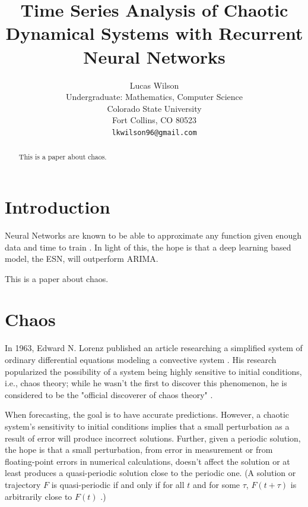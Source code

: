 \documentclass{article}
\title{Time Series Analysis of Chaotic Dynamical Systems with Recurrent Neural Networks}
\author{
  Lucas Wilson \\
  Undergraduate: Mathematics, Computer Science \\
  Colorado State University\\
  Fort Collins, CO 80523 \\
  \texttt{lkwilson96@gmail.com} \\
}
\begin{document}
\maketitle

\begin{abstract}
This is a paper about chaos.
\end{abstract}

\section{Introduction}

Neural Networks are known to be able to approximate any function given enough
data and time to train \cite{cybenko1989approximation}. In light of this, the
hope is that a deep learning based model, the ESN, will outperform ARIMA.

This is a paper about chaos.

\section{Chaos}


In 1963, Edward N. Lorenz published an article researching a simplified
system of ordinary differential equations modeling a convective system
\cite{lorenz1963deterministic}. His research popularized the possibility of a
system being highly sensitive to initial conditions, i.e., chaos theory;
while he wasn't the first to discover this phenomenon, he is considered to be
the "official discoverer of chaos theory" \cite{oestreicher2007history}.

When forecasting, the goal is to have accurate predictions. However, a
chaotic system's sensitivity to initial conditions implies that a small
perturbation as a result of error will produce incorrect solutions. Further,
given a periodic solution, the hope is that a small perturbation, from error
in measurement or from floating-point errors in numerical calculations,
doesn't affect the solution or at least produces a quasi-periodic solution
close to the periodic one. (A solution or trajectory $F$ is quasi-periodic if
and only if for all $t$ and for some $\tau$, $F(t+\tau)$ is arbitrarily close
to $F(t)$ \cite{lorenz1963deterministic}.)
\end{document}
